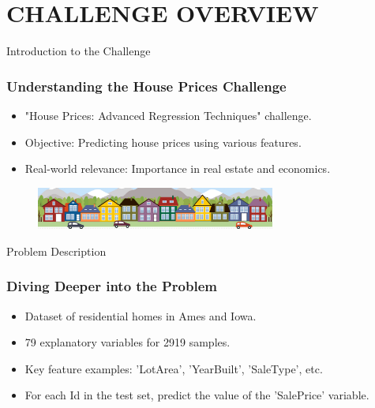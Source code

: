 \section{CHALLENGE OVERVIEW}
\label{challenge_overview_section}


\begin{frame}{Introduction to the Challenge}
    \frametitle{Understanding the House Prices Challenge}
    \begin{itemize}
        \item "House Prices: Advanced Regression Techniques" challenge.
        \item Objective: Predicting house prices using various features.
        \item Real-world relevance: Importance in real estate and economics.      
    \end{itemize}
    \vspace{1.5cm}
    \begin{figure}
        \includegraphics[width=0.7\textwidth]{figures/housesbanner.png} %
    \end{figure}
\end{frame}

\begin{frame}{Problem Description}
    \frametitle{Diving Deeper into the Problem}
    \begin{itemize}
        \item Dataset of residential homes in Ames and Iowa.
        \item 79 explanatory variables for 2919 samples.
        \item Key feature examples: 'LotArea', 'YearBuilt', 'SaleType', etc.
        \item For each Id in the test set, predict the value of the 'SalePrice' variable.
    \end{itemize}
\end{frame}

